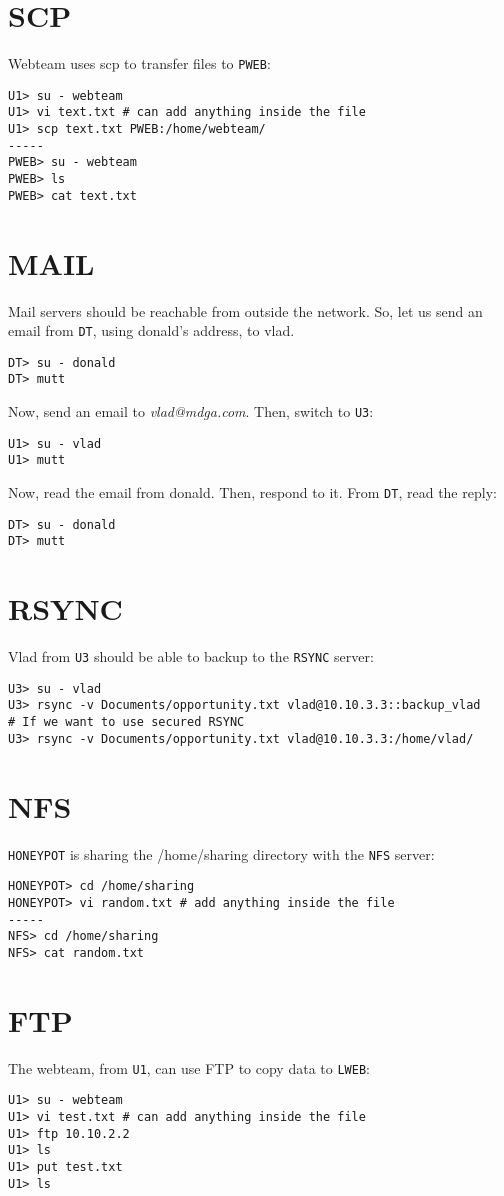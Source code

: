\documentclass[a4paper, 11pt, oneside]{article}
\begin{document}
\section{SCP}
\noindent Webteam uses scp to transfer files to \texttt{PWEB}:
\begin{lstlisting}
U1> su - webteam
U1> vi text.txt # can add anything inside the file
U1> scp text.txt PWEB:/home/webteam/
-----
PWEB> su - webteam
PWEB> ls
PWEB> cat text.txt
\end{lstlisting}

\section{MAIL}
\noindent Mail servers should be reachable from outside the network. So, let us send an email from \texttt{DT}, using donald's address, to vlad.
\begin{lstlisting}
DT> su - donald
DT> mutt
\end{lstlisting}
Now, send an email to \textit{vlad@mdga.com}. Then, switch to \texttt{U3}:
\begin{lstlisting}
U1> su - vlad
U1> mutt
\end{lstlisting}
Now, read the email from donald. Then, respond to it. From \texttt{DT}, read the reply:
\begin{lstlisting}
DT> su - donald
DT> mutt
\end{lstlisting}

\section{RSYNC}
\noindent Vlad from \texttt{U3} should be able to backup to the \texttt{RSYNC} server:
\begin{lstlisting}
U3> su - vlad
U3> rsync -v Documents/opportunity.txt vlad@10.10.3.3::backup_vlad
# If we want to use secured RSYNC
U3> rsync -v Documents/opportunity.txt vlad@10.10.3.3:/home/vlad/
\end{lstlisting}

\section{NFS}
\noindent \texttt{HONEYPOT} is sharing the /home/sharing directory with the \texttt{NFS} server:
\begin{lstlisting}
HONEYPOT> cd /home/sharing
HONEYPOT> vi random.txt # add anything inside the file
-----
NFS> cd /home/sharing
NFS> cat random.txt
\end{lstlisting}

\section{FTP}
\noindent The webteam, from \texttt{U1}, can use FTP to copy data to \texttt{LWEB}:
\begin{lstlisting}
U1> su - webteam
U1> vi test.txt # can add anything inside the file
U1> ftp 10.10.2.2
U1> ls
U1> put test.txt
U1> ls
\end{lstlisting}
\end{document}
